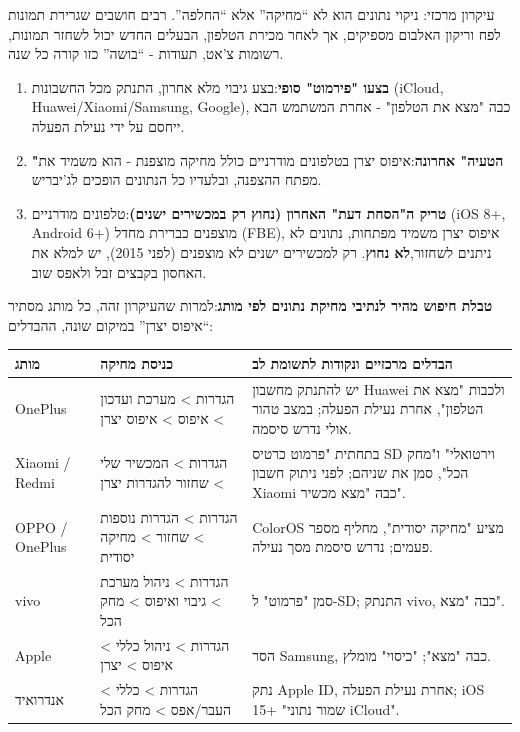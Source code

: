 


עיקרון מרכזי: ניקוי נתונים הוא לא “מחיקה” אלא “החלפה”. רבים חושבים שגרירת תמונות לפח וריקון האלבום מספיקים, אך לאחר מכירת הטלפון, הבעלים החדש יכול לשחזר תמונות, רשומות צ'אט, תעודות - “בושה” כזו קורה כל שנה.

\begin{enumerate}
  \item \textbf{בצעו "פירמוט" סופי}:בצע גיבוי מלא אחרון, התנתק מכל החשבונות (iCloud, Huawei/Xiaomi/Samsung, Google), כבה "מצא את הטלפון" - אחרת המשתמש הבא ייחסם על ידי נעילת הפעלה.
  \item \textbf{"הטעיה" אחרונה}:איפוס יצרן בטלפונים מודרניים כולל מחיקה מוצפנת - הוא משמיד את מפתח ההצפנה, ובלעדיו כל הנתונים הופכים לג'יבריש.
  \item \textbf{טריק ה"הסחת דעת" האחרון (נחוץ רק במכשירים ישנים)}:טלפונים מודרניים (iOS 8+, Android 6+) מוצפנים כברירת מחדל (FBE), איפוס יצרן משמיד מפתחות, נתונים לא ניתנים לשחזור,\textbf{לא נחוץ}. רק למכשירים ישנים לא מוצפנים (לפני 2015), יש למלא את האחסון בקבצים זבל ולאפס שוב.
\end{enumerate}

\textbf{טבלת חיפוש מהיר לנתיבי מחיקת נתונים לפי מותג}:למרות שהעיקרון זהה, כל מותג מסתיר “איפוס יצרן” במיקום שונה, ההבדלים:

\begin{center}
\begin{tabularx}{\linewidth}{|X|X|X|}
\hline
\textbf{מותג} & \textbf{כניסת מחיקה} & \textbf{הבדלים מרכזיים ונקודות לתשומת לב} \tabularnewline
\hline
OnePlus & הגדרות > מערכת ועדכון > איפוס > איפוס יצרן & יש להתנתק מחשבון Huawei ולכבות "מצא את הטלפון", אחרת נעילת הפעלה; במצב טהור אולי נדרש סיסמה. \tabularnewline
Xiaomi / Redmi & הגדרות > המכשיר שלי > שחזור להגדרות יצרן & בתחתית "פרמוט כרטיס SD וירטואלי" ו"מחק הכל", סמן את שניהם; לפני ניתוק חשבון Xiaomi כבה "מצא מכשיר". \tabularnewline
OPPO / OnePlus & הגדרות > הגדרות נוספות > שחזור > מחיקה יסודית & ColorOS מציע "מחיקה יסודית", מחליף מספר פעמים; נדרש סיסמת מסך נעילה. \tabularnewline
vivo & הגדרות > ניהול מערכת > גיבוי ואיפוס > מחק הכל & סמן "פרמוט" ל-SD; התנתק vivo, כבה "מצא". \tabularnewline
Apple & הגדרות > ניהול כללי > איפוס > יצרן & הסר Samsung, כבה "מצא"; "כיסוי" מומלץ. \tabularnewline
אנדרואיד & הגדרות > כללי > העבר/אפס > מחק הכל & נתק Apple ID, אחרת נעילת הפעלה; iOS 15+ "שמור נתוני iCloud". \tabularnewline
\hline
\end{tabularx}
\end{center}

